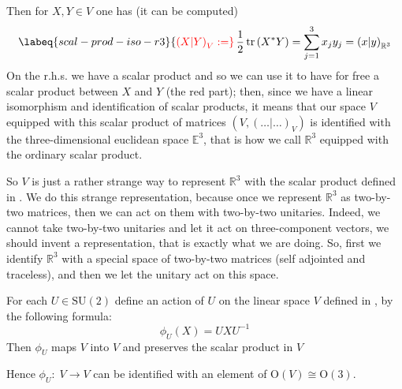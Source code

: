 \documentclass[../main.tex]{subfiles}
\begin{document}
Then for $X,Y\in V$ one has (it can be computed)
\begin{equation}\labeq{scal-prod-iso-r3}
{\color{red}\left(X|Y\right)_{V}:=}\,\frac{1}{2}\tr\pqty{X^\ast Y}=\sum_{j=1}^3x_jy_j=\left(x|y\right)_{\mathbb{R}^3}
\end{equation}
On the r.h.s. we have a scalar product and so we can use it to have for free a scalar product between $X$ and $Y$ (the red part); then, since we have a linear isomorphism and identification of scalar products, it means that our space $V$ equipped with this scalar product of matrices $\left(V,(\dots|\dots)_V\right)$ is identified with the three-dimensional euclidean space $\mathbb{E}^3$, that is how we call $\mathbb{R}^3$ equipped with the ordinary scalar product.

So $V$ is just a rather strange way to represent $\mathbb{R}^3$ with the scalar product defined in . We do this strange representation, because once we represent $\mathbb{R}^3$ as two-by-two matrices, then we can act on them with two-by-two unitaries. Indeed, we cannot take two-by-two unitaries and let it act on three-component vectors, we should invent a representation, that is exactly what we are doing. So, first we identify $\mathbb{R}^3$ with a special space of two-by-two matrices (self adjointed and traceless), and then we let the unitary act on this space.
\begin{lemma}
For each $U\in\textrm{SU}(2)$ define an action of $U$ on the linear space $V$ defined in , by the following formula:
\[
\phi_U(X)=UXU^{-1}
\]
Then $\phi_U$ maps $V$ into $V$ and preserves the scalar product in $V$
\end{lemma}
\begin{corollary}
Hence $\phi_U:\; V\to V$ can be identified with an element of $\textrm{O}(V)\cong \textrm{O}(3)$.
\end{corollary}
\end{document}
